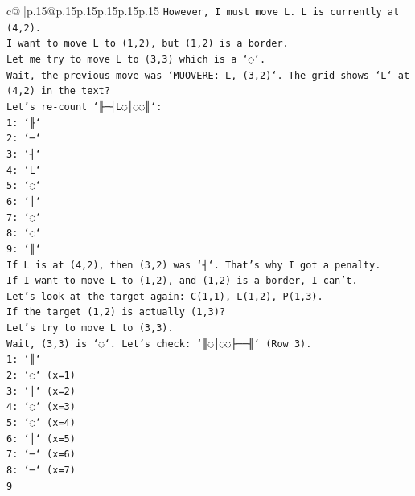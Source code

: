 \documentclass{article}
\begin{document}
{\begin{supertabular}{c@{$\;$}|p{.15\linewidth}@{}p{.15\linewidth}p{.15\linewidth}p{.15\linewidth}p{.15\linewidth}p{.15\linewidth}}
{{{\texttt{However, I must move L. L is currently at (4,2).} \\
\texttt{I want to move L to (1,2), but (1,2) is a border.} \\
\texttt{Let me try to move L to (3,3) which is a `◌`.} \\
\texttt{Wait, the previous move was `MUOVERE: L, (3,2)`. The grid shows `L` at (4,2) in the text?} \\
\texttt{Let's re{-}count `╟─┤L◌│◌◌║`:} \\
\texttt{1: `╟`} \\
\texttt{2: `─`} \\
\texttt{3: `┤`} \\
\texttt{4: `L`} \\
\texttt{5: `◌`} \\
\texttt{6: `│`} \\
\texttt{7: `◌`} \\
\texttt{8: `◌`} \\
\texttt{9: `║`} \\
\texttt{If L is at (4,2), then (3,2) was `┤`. That's why I got a penalty.} \\
\texttt{If I want to move L to (1,2), and (1,2) is a border, I can't.} \\
\texttt{Let's look at the target again: C(1,1), L(1,2), P(1,3).} \\
\texttt{If the target (1,2) is actually (1,3)?} \\
\texttt{Let's try to move L to (3,3).} \\
\texttt{Wait, (3,3) is `◌`. Let's check: `║◌│◌◌├──╢` (Row 3).} \\
\texttt{1: `║`} \\
\texttt{2: `◌` (x=1)} \\
\texttt{3: `│` (x=2)} \\
\texttt{4: `◌` (x=3)} \\
\texttt{5: `◌` (x=4)} \\
\texttt{6: `│` (x=5)} \\
\texttt{7: `─` (x=6)} \\
\texttt{8: `─` (x=7)} \\
\texttt{9} \\
            }
        }
    }
     \\ \\


\end{supertabular}}
\end{document}

